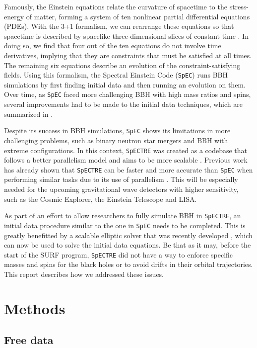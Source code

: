 \documentclass{../document}
\begin{document}
    Famously, the Einstein equations relate the curvature of spacetime to the stress-energy of matter, forming a system of ten nonlinear partial differential equations (PDEs). With the 3+1 formalism, we can rearrange these equations so that spacetime is described by spacelike three-dimensional slices of constant time \cite{Alcubierre}. In doing so, we find that four out of the ten equations do not involve time derivatives, implying that they are constraints that must be satisfied at all times. The remaining six equations describe an evolution of the constraint-satisfying fields. Using this formalism, the Spectral Einstein Code ({\tt SpEC}) \cite{SpEC} runs BBH simulations by first finding initial data and then running an evolution on them. Over time, as {\tt SpEC} faced more challenging BBH with high mass ratios and spins, several improvements had to be made to the initial data techniques, which are summarized in \cite{Serguei}.
    
    Despite its success in BBH simulations, {\tt SpEC} shows its limitations in more challenging problems, such as binary neutron star mergers and BBH with extreme configurations. In this context, {\tt SpECTRE} \cite{SpECTRE} was created as a codebase that follows a better parallelism model and aims to be more scalable \cite{Kidder}. Previous work has already shown that {\tt SpECTRE} can be faster and more accurate than {\tt SpEC} when performing similar tasks due to its use of parallelism \cite{Vu}. This will be especially needed for the upcoming gravitational wave detectors with higher sensitivity, such as the Cosmic Explorer, the Einstein Telescope and LISA.
    
    As part of an effort to allow researchers to fully simulate BBH in {\tt SpECTRE}, an initial data procedure similar to the one in {\tt SpEC} needs to be completed. This is greatly benefitted by a scalable elliptic solver that was recently developed \cite{Vu}, which can now be used to solve the initial data equations. Be that as it may, before the start of the SURF program, {\tt SpECTRE} did not have a way to enforce specific masses and spins for the black holes or to avoid drifts in their orbital trajectories. This report describes how we addressed these issues.

  \section{Methods}

    \subsection{Free data}
\end{document}
